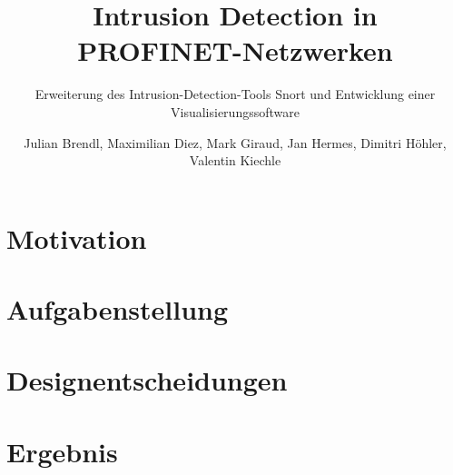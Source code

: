 \documentclass[18pt]{beamer}
\title[Intrusion Detection in PROFINET-Netzwerken]{Intrusion Detection in PROFINET-Netzwerken}
\subtitle{Erweiterung des Intrusion-Detection-Tools Snort und Entwicklung einer Visualisierungssoftware}
\author{Julian Brendl, Maximilian Diez, Mark Giraud, Jan Hermes, Dimitri Höhler, Valentin Kiechle}
\institute{Fraunhofer IOSB: Gruppe für sichere vernetzte Systeme}
\begin{document}

\begin{frame}
\titlepage
\end{frame}

\section{Motivation}
    
\section{Aufgabenstellung}
    
\section{Designentscheidungen}
    
\section{Ergebnis}
    
\end{document}
